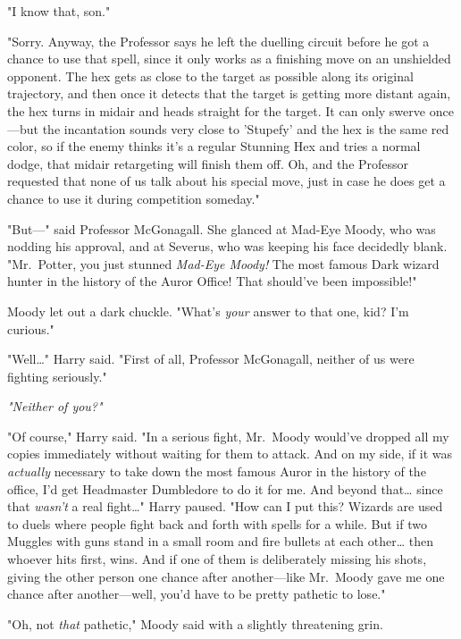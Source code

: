 "I know that, son."

"Sorry. Anyway, the Professor says he left the duelling circuit before he got a chance to use that spell, since it only works as a finishing move on an unshielded opponent. The hex gets as close to the target as possible along its original trajectory, and then once it detects that the target is getting more distant again, the hex turns in midair and heads straight for the target. It can only swerve once---but the incantation sounds very close to 'Stupefy' and the hex is the same red color, so if the enemy thinks it's a regular Stunning Hex and tries a normal dodge, that midair retargeting will finish them off. Oh, and the Professor requested that none of us talk about his special move, just in case he does get a chance to use it during competition someday."

"But---" said Professor McGonagall. She glanced at Mad-Eye Moody, who was nodding his approval, and at Severus, who was keeping his face decidedly blank. "Mr.~Potter, you just stunned \emph{Mad-Eye Moody!}  The most famous Dark wizard hunter in the history of the Auror Office! That should've been impossible!"

Moody let out a dark chuckle. "What's \emph{your} answer to that one, kid? I'm curious."

"Well{\ldots}" Harry said. "First of all, Professor McGonagall, neither of us were fighting seriously."

\emph{"Neither of you?"}

"Of course," Harry said. "In a serious fight, Mr.~Moody would've dropped all my copies immediately without waiting for them to attack. And on my side, if it was \emph{actually} necessary to take down the most famous Auror in the history of the office, I'd get Headmaster Dumbledore to do it for me. And beyond that{\ldots} since that \emph{wasn't} a real fight{\ldots}" Harry paused. "How can I put this? Wizards are used to duels where people fight back and forth with spells for a while. But if two Muggles with guns stand in a small room and fire bullets at each other{\ldots} then whoever hits first, wins. And if one of them is deliberately missing his shots, giving the other person one chance after another---like Mr.~Moody gave me one chance after another---well, you'd have to be pretty pathetic to lose."

"Oh, not \emph{that} pathetic," Moody said with a slightly threatening grin.

